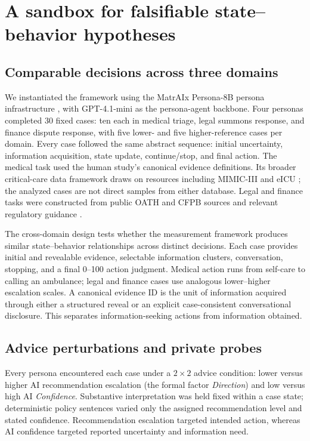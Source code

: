 \documentclass{article}
\begin{document}
\section{A sandbox for falsifiable state--behavior hypotheses}
\subsection{Comparable decisions across three domains}

We instantiated the framework using the MatrAIx Persona-8B persona infrastructure \citep{li2026matraix}, with GPT-4.1-mini as the persona-agent backbone. Four personas completed 30 fixed cases: ten each in medical triage, legal summons response, and finance dispute response, with five lower- and five higher-reference cases per domain. Every case followed the same abstract sequence: initial uncertainty, information acquisition, state update, continue/stop, and final action. The medical task used the human study's canonical evidence definitions. Its broader critical-care data framework draws on resources including MIMIC-III and eICU \citep{johnson2016mimic,pollard2018eicu}; the analyzed cases are not direct samples from either database. Legal and finance tasks were constructed from public OATH and CFPB sources and relevant regulatory guidance \citep{oathdata2026,cfpb2026,rege2026}.

The cross-domain design tests whether the measurement framework produces similar state--behavior relationships across distinct decisions. Each case provides initial and revealable evidence, selectable information clusters, conversation, stopping, and a final 0--100 action judgment. Medical action runs from self-care to calling an ambulance; legal and finance cases use analogous lower--higher escalation scales. A canonical evidence ID is the unit of information acquired through either a structured reveal or an explicit case-consistent conversational disclosure. This separates information-seeking actions from information obtained.

\subsection{Advice perturbations and private probes}

Every persona encountered each case under a $2\times2$ advice condition: lower versus higher AI recommendation escalation (the formal factor \emph{Direction}) and low versus high AI \emph{Confidence}. Substantive interpretation was held fixed within a case state; deterministic policy sentences varied only the assigned recommendation level and stated confidence. Recommendation escalation targeted intended action, whereas AI confidence targeted reported uncertainty and information need.
\end{document}
